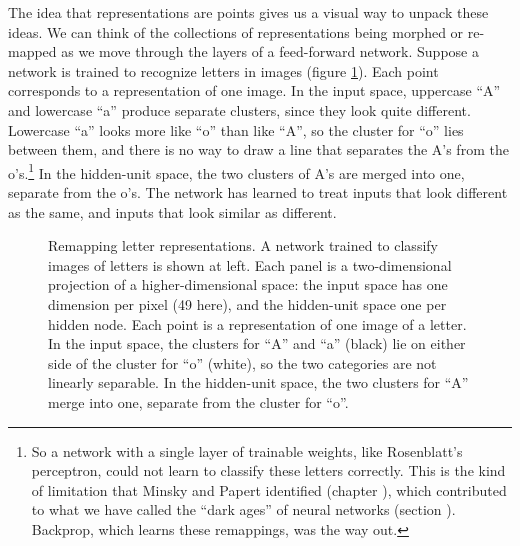 The idea that representations are points gives us a visual way to unpack these ideas. We can think of the collections of representations being morphed or re-mapped as we move through the layers of a feed-forward network. Suppose a network is trained to recognize letters in images (figure \ref{remappingClusters}). Each point corresponds to a representation of one image. In the input space, uppercase ``A'' and lowercase ``a'' produce separate clusters, since they look quite different. Lowercase ``a'' looks more like ``o'' than like ``A'', so the cluster for ``o'' lies between them, and there is no way to draw a line that separates the A's from the o's.\footnote{So a network with a single layer of trainable weights, like Rosenblatt's perceptron, could not learn to classify these letters correctly. This is the kind of limitation that Minsky and Papert identified \cite{minsky1969perceptrons} (chapter ), which contributed to what we have called the ``dark ages'' of neural networks (section ). Backprop, which learns these remappings, was the way out.} In the hidden-unit space, the two clusters of A's are merged into one, separate from the o's. The network has learned to treat inputs that look different as the same, and inputs that look similar as different.
\begin{figure}[htbp]
\centering
{}
\caption[Jeff Yoshimi.]{Remapping letter representations. A network trained to classify images of letters is shown at left. Each panel is a two-dimensional projection of a higher-dimensional space: the input space has one dimension per pixel (49 here), and the hidden-unit space one per hidden node. Each point is a representation of one image of a letter. In the input space, the clusters for ``A'' and ``a'' (black) lie on either side of the cluster for ``o'' (white), so the two categories are not linearly separable. In the hidden-unit space, the two clusters for ``A'' merge into one, separate from the cluster for ``o''.}
\label{remappingClusters}
\end{figure}

